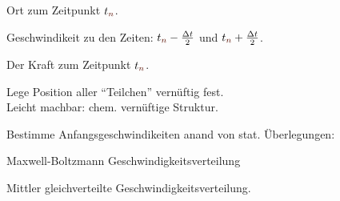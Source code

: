 \begin{notebox}
  \begin{numberlist}
      \item Ort zum Zeitpunkt $\tn$.
      \item Geschwindikeit zu den Zeiten: $\tn-\frac{\Delta t}{2}$ und $\tn+\frac{\Delta t}{2}$.
      \item Der Kraft zum Zeitpunkt $\tn$.
  \end{numberlist}
\end{notebox}
\begin{notebox}
  \begin{circlelist}
      \item Lege Position aller ``Teilchen'' vernüftig fest.\\
    Leicht machbar: chem. vernüftige Struktur.
      \item Bestimme Anfangsgeschwindikeiten anand von stat. Überlegungen:
    \begin{numberlist}
        \item Maxwell-Boltzmann Geschwindigkeitsverteilung 
        \item Mittler gleichverteilte Geschwindigkeitsverteilung.
    \end{numberlist}
  \end{circlelist}
\end{notebox}
